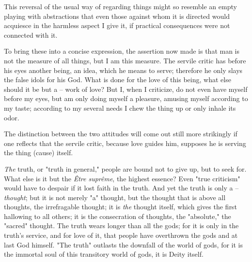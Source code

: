  This reversal of the usual way of regarding things might so resemble an empty 
playing with abstractions that even those against whom it is directed would 
acquiesce in the harmless aspect I give it, if practical consequences were not 
connected with it.

To bring these into a concise expression, the assertion now made is that man 
is not the measure of all things, but I am this measure. The servile critic 
has before his eyes another being, an idea, which he means to serve; therefore 
he only slays the false idols for his God. What is done for the love of this 
being, what else should it be but a -- work of love? But I, when I criticize, 
do not even have myself before my eyes, but am only doing myself a pleasure, 
amusing myself according to my taste; according to my several needs I chew the 
thing up or only inhale its odor.

The distinction between the two attitudes will come out still more strikingly 
if one reflects that the servile critic, because love guides him, supposes he 
is serving the thing (cause) itself.

\textit{The} truth, or "{}truth in general,"{} people are bound not to give 
up, but to seek for. What else is it but the \textit{\^Etre supr\^eme}, the 
highest essence? Even "{}true criticism"{} would have to despair if it lost 
faith in the truth. And yet the truth is only a -- \textit{thought}; but it is 
not merely "{}a"{} thought, but the thought that is above all thoughts, the 
irrefragable thought; it is \textit{the} thought itself, which gives the first 
hallowing to all others; it is the consecration of thoughts, the 
"{}absolute,"{} the "{}sacred"{} thought. The truth wears longer than all the 
gods; for it is only in the truth's service, and for love of it, that people 
have overthrown the gods and at last God himself. "{}The truth"{} outlasts the 
downfall of the world of gods, for it is the immortal soul of this transitory 
world of gods, it is Deity itself.

